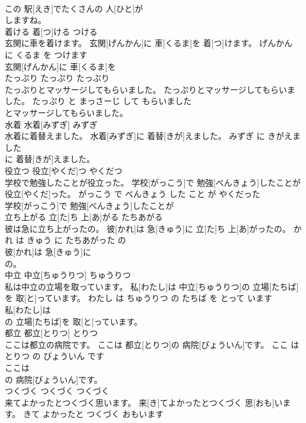 \documentclass[8pt]{extreport}
\begin{document}
\begin{CJK}{UTF8}{min}
\\	この 駅[えき]でたくさんの 人[ひと]が
\\	しますね。			
\\	着ける	着[つ]ける	つける	
\\	玄関に車を着けます。	玄関[げんかん]に 車[くるま]を 着[つ]けます。	げんかん に くるま を つけます	
\\	玄関[げんかん]に 車[くるま]を
\\	たっぷり	たっぷり	たっぷり	
\\	たっぷりとマッサージしてもらいました。	たっぷりとマッサージしてもらいました。	たっぷり と まっさーじ して もらいました	
\\	とマッサージしてもらいました。			
\\	水着	水着[みずぎ]	みずぎ	
\\	水着に着替えました。	水着[みずぎ]に 着替[きが]えました。	みずぎ に きがえました	
\\	に 着替[きが]えました。			
\\	役立つ	役立[やくだ]つ	やくだつ	
\\	学校で勉強したことが役立った。	学校[がっこう]で 勉強[べんきょう]したことが 役立[やくだ]った。	がっこう で べんきょう した こと が やくだった	
\\	学校[がっこう]で 勉強[べんきょう]したことが
\\	立ち上がる	立[た]ち 上[あ]がる	たちあがる	
\\	彼は急に立ち上がったの。	彼[かれ]は 急[きゅう]に 立[た]ち 上[あ]がったの。	かれ は きゅう に たちあがった の	
\\	彼[かれ]は 急[きゅう]に
\\	の。			
\\	中立	中立[ちゅうりつ]	ちゅうりつ	
\\	私は中立の立場を取っています。	私[わたし]は 中立[ちゅうりつ]の 立場[たちば]を 取[と]っています。	わたし は ちゅうりつ の たちば を とって います	
\\	私[わたし]は
\\	の 立場[たちば]を 取[と]っています。			
\\	都立	都立[とりつ]	とりつ	
\\	ここは都立の病院です。	ここは 都立[とりつ]の 病院[びょういん]です。	ここ は とりつ の びょういん です	
\\	ここは
\\	の 病院[びょういん]です。			
\\	つくづく	つくづく	つくづく	
\\	来てよかったとつくづく思います。	来[き]てよかったとつくづく 思[おも]います。	きて よかったと つくづく おもいます	

\end{CJK}
\end{document}
